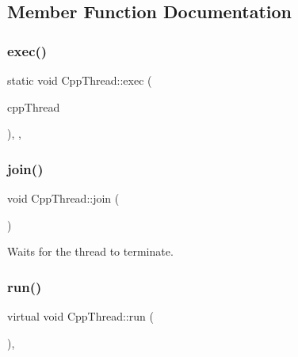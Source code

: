 \subsection{Member Function Documentation}
\mbox{\label{classCppThread_a499b353ef5b5f187ad5eddf638eeb95e}} 
\subsubsection{\texorpdfstring{exec()}{exec()}}
{\footnotesize\ttfamily static void Cpp\+Thread\+::exec (\begin{DoxyParamCaption}\item[{\hyperlink{classCppThread}{Cpp\+Thread} $\ast$}]{cpp\+Thread }\end{DoxyParamCaption})\hspace{0.3cm}{\ttfamily [inline]}, {\ttfamily [static]}, {\ttfamily [private]}}

\mbox{\label{classCppThread_a8ff0fda6b913cc53764caef0e1200f3f}} 
\subsubsection{\texorpdfstring{join()}{join()}}
{\footnotesize\ttfamily void Cpp\+Thread\+::join (\begin{DoxyParamCaption}{ }\end{DoxyParamCaption})\hspace{0.3cm}{\ttfamily [inline]}}

Waits for the thread to terminate. \mbox{\label{classCppThread_a792b79e72250710147c452648def4a78}} 
\subsubsection{\texorpdfstring{run()}{run()}}
{\footnotesize\ttfamily virtual void Cpp\+Thread\+::run (\begin{DoxyParamCaption}{ }\end{DoxyParamCaption})\hspace{0.3cm}{\ttfamily [protected]}, {}}

